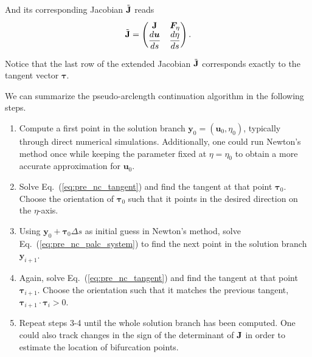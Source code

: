 And its corresponding Jacobian $\tilde{\mathbf{J}}$ reads
\begin{equation}
    \tilde{\mathbf{J}} = 
    \begin{pmatrix}
        \mathbf{J} & \bm{F}_\eta \\
        \dfrac{d\bm{u}}{ds} & \dfrac{d\eta}{ds} \\
    \end{pmatrix}.
\end{equation}

Notice that the last row of the extended Jacobian $\tilde{\mathbf{J}}$ corresponds
exactly to the tangent vector $\bm{\tau}$. 

We can summarize the pseudo-arclength continuation algorithm in the following steps.

\begin{enumerate}
    \item Compute a first point in the solution branch $\bm{y}_0 = (\bm{u}_0, \eta_0)$,
    typically through direct numerical simulations. Additionally, one could run
    Newton's method once while keeping the parameter fixed at $\eta = \eta_0$ to obtain
    a more accurate approximation for $\bm{u}_0$.

    \item Solve Eq.~(\ref{eq:pre_nc_tangent}) and find the tangent at that point $\bm{\tau}_0$.
    Choose the orientation of $\bm{\tau}_0$ such that it points in the desired direction on the
    $\eta$-axis.

    \item Using $\bm{y}_0 + \bm{\tau}_0 \Delta s$ as initial guess in Newton's method, solve
    Eq.~(\ref{eq:pre_nc_palc_system}) to find the next point in the solution branch $\bm{y}_{i+1}$.

    \item Again, solve Eq.~(\ref{eq:pre_nc_tangent}) and find the tangent at that point $\bm{\tau}_{i+1}$.
    Choose the orientation such that it matches the previous tangent, $\bm{\tau}_{i+1} \cdot \bm{\tau}_i > 0$.

    \item Repeat steps 3-4 until the whole solution branch has been computed. One could also
    track changes in the sign of the determinant of $\mathbf{J}$ in order to estimate the location
    of bifurcation points.
\end{enumerate}


